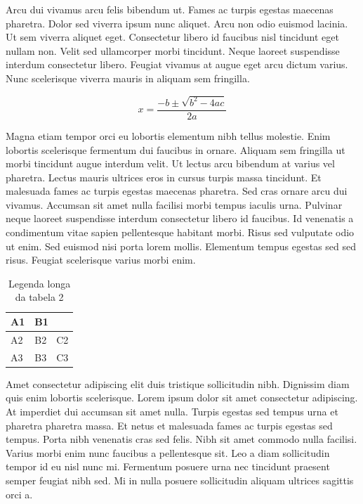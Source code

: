 \documentclass[12pt]{article}
\begin{document}
\begin{multicols}{3}
		Arcu dui vivamus arcu felis bibendum ut. Fames ac turpis egestas maecenas pharetra. Dolor sed viverra ipsum nunc aliquet. Arcu non odio euismod lacinia. Ut sem viverra aliquet eget. Consectetur libero id faucibus nisl tincidunt eget nullam non. Velit sed ullamcorper morbi tincidunt. Neque laoreet suspendisse interdum consectetur libero. Feugiat vivamus at augue eget arcu dictum varius. Nunc scelerisque viverra mauris in aliquam sem fringilla.

		\begin{equation} %
		x = \frac{-b \pm \sqrt{b^2 -4ac}}{2a}
		\end{equation}

		Magna etiam tempor orci eu lobortis elementum nibh tellus molestie. Enim lobortis scelerisque fermentum dui faucibus in ornare. Aliquam sem fringilla ut morbi tincidunt augue interdum velit. Ut lectus arcu bibendum at varius vel pharetra. Lectus mauris ultrices eros in cursus turpis massa tincidunt. Et malesuada fames ac turpis egestas maecenas pharetra. Sed cras ornare arcu dui vivamus. Accumsan sit amet nulla facilisi morbi tempus iaculis urna. Pulvinar neque laoreet suspendisse interdum consectetur libero id faucibus. Id venenatis a condimentum vitae sapien pellentesque habitant morbi. Risus sed vulputate odio ut enim. Sed euismod nisi porta lorem mollis. Elementum tempus egestas sed sed risus. Feugiat scelerisque varius morbi enim.
		\begin{table}[H] %
			\centering
			\caption[Legenda curta da tabela 2]{Legenda longa da tabela 2}
			\label{tab:tab4}
			\begin{tabular}{|l|l|l|}
				\hline
				A1 & \multicolumn{2}{l|}{B1} \\ \hline %
				A2 & B2         & C2         \\ \hline
				A3 & B3         & C3         \\ \hline
			\end{tabular}
		\end{table}
		Amet consectetur adipiscing elit duis tristique sollicitudin nibh. Dignissim diam quis enim lobortis scelerisque. Lorem ipsum dolor sit amet consectetur adipiscing. At imperdiet dui accumsan sit amet nulla. Turpis egestas sed tempus urna et pharetra pharetra massa. Et netus et malesuada fames ac turpis egestas sed tempus. Porta nibh venenatis cras sed felis. Nibh sit amet commodo nulla facilisi. Varius morbi enim nunc faucibus a pellentesque sit. Leo a diam sollicitudin tempor id eu nisl nunc mi. Fermentum posuere urna nec tincidunt praesent semper feugiat nibh sed. Mi in nulla posuere sollicitudin aliquam ultrices sagittis orci a.
		
	\end{multicols}
	\newpage
	
\end{document}
